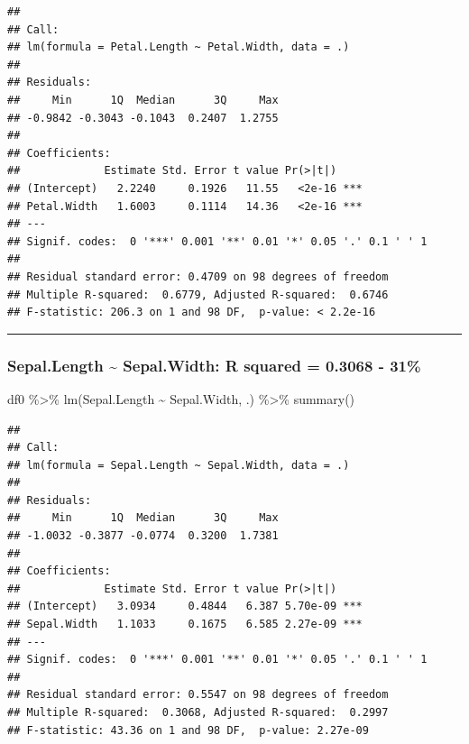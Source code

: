 \documentclass[
]{article}
\newenvironment{Shaded}{\begin{snugshade}}{\end{snugshade}}
\newcommand{\FunctionTok}[1]{\textcolor[rgb]{0.00,0.00,0.00}{#1}}
\newcommand{\NormalTok}[1]{#1}
\newcommand{\SpecialCharTok}[1]{\textcolor[rgb]{0.00,0.00,0.00}{#1}}
\begin{document}
\begin{verbatim}
## 
## Call:
## lm(formula = Petal.Length ~ Petal.Width, data = .)
## 
## Residuals:
##     Min      1Q  Median      3Q     Max 
## -0.9842 -0.3043 -0.1043  0.2407  1.2755 
## 
## Coefficients:
##             Estimate Std. Error t value Pr(>|t|)    
## (Intercept)   2.2240     0.1926   11.55   <2e-16 ***
## Petal.Width   1.6003     0.1114   14.36   <2e-16 ***
## ---
## Signif. codes:  0 '***' 0.001 '**' 0.01 '*' 0.05 '.' 0.1 ' ' 1
## 
## Residual standard error: 0.4709 on 98 degrees of freedom
## Multiple R-squared:  0.6779, Adjusted R-squared:  0.6746 
## F-statistic: 206.3 on 1 and 98 DF,  p-value: < 2.2e-16
\end{verbatim}

\begin{center}\rule{0.5\linewidth}{0.5pt}\end{center}

\hypertarget{sepal.length-sepal.width-r-squared-0.3068---31}{%
\subsubsection{Sepal.Length \textasciitilde{} Sepal.Width: R squared =
0.3068 - 31\%}\label{sepal.length-sepal.width-r-squared-0.3068---31}}

\begin{Shaded}
\begin{Highlighting}[]
\NormalTok{df0 }\SpecialCharTok{\%\textgreater{}\%} \FunctionTok{lm}\NormalTok{(Sepal.Length }\SpecialCharTok{\textasciitilde{}}\NormalTok{ Sepal.Width, .) }\SpecialCharTok{\%\textgreater{}\%} \FunctionTok{summary}\NormalTok{()}
\end{Highlighting}
\end{Shaded}

\begin{verbatim}
## 
## Call:
## lm(formula = Sepal.Length ~ Sepal.Width, data = .)
## 
## Residuals:
##     Min      1Q  Median      3Q     Max 
## -1.0032 -0.3877 -0.0774  0.3200  1.7381 
## 
## Coefficients:
##             Estimate Std. Error t value Pr(>|t|)    
## (Intercept)   3.0934     0.4844   6.387 5.70e-09 ***
## Sepal.Width   1.1033     0.1675   6.585 2.27e-09 ***
## ---
## Signif. codes:  0 '***' 0.001 '**' 0.01 '*' 0.05 '.' 0.1 ' ' 1
## 
## Residual standard error: 0.5547 on 98 degrees of freedom
## Multiple R-squared:  0.3068, Adjusted R-squared:  0.2997 
## F-statistic: 43.36 on 1 and 98 DF,  p-value: 2.27e-09
\end{verbatim}
\end{document}
